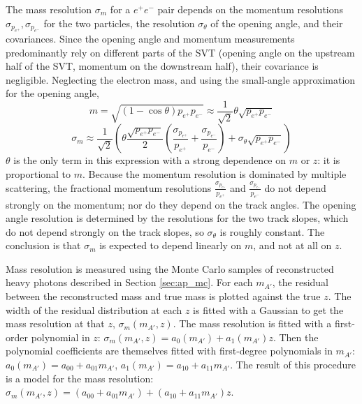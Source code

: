 The mass resolution $\sigma_m$ for a $e^+e^-$ pair depends on the momentum resolutions $\sigma_{p_{e^+}},\sigma_{p_{e^-}}$ for the two particles, the resolution $\sigma_\theta$ of the opening angle, and their covariances.
Since the opening angle and momentum measurements predominantly rely on different parts of the SVT (opening angle on the upstream half of the SVT, momentum on the downstream half), their covariance is negligible.
Neglecting the electron mass, and using the small-angle approximation for the opening angle,
\begin{equation}
m=\sqrt{(1-\cos\theta)p_{e^+}p_{e^-}} \approx \frac{1}{\sqrt{2}}\theta\sqrt{p_{e^+}p_{e^-}}
\end{equation}
\begin{equation}
\sigma_m\approx \frac{1}{\sqrt{2}}\left(\theta \frac{\sqrt{p_{e^+}p_{e^-}}}{2}\left(\frac{\sigma_{p_{e^+}}}{p_{e^+}}+\frac{\sigma_{p_{e^-}}}{p_{e^-}}\right)  + \sigma_\theta\sqrt{p_{e^+}p_{e^-}} \right)
\end{equation}
$\theta$ is the only term in this expression with a strong dependence on $m$ or $z$: it is proportional to $m$.
Because the momentum resolution is dominated by multiple scattering, the fractional momentum resolutions $\frac{\sigma_{p_{e^+}}}{p_{e^+}}$ and $\frac{\sigma_{p_{e^-}}}{p_{e^-}}$ do not depend strongly on the momentum; nor do they depend on the track angles.
The opening angle resolution is determined by the resolutions for the two track slopes, which do not depend strongly on the track slopes, so $\sigma_\theta$ is roughly constant.
The conclusion is that $\sigma_m$ is expected to depend linearly on $m$, and not at all on $z$.

Mass resolution is measured using the Monte Carlo samples of reconstructed heavy photons described in Section \ref{sec:ap_mc}.
For each $m_{A'}$, the residual between the reconstructed mass and true mass is plotted against the true $z$.
The width of the residual distribution at each $z$ is fitted with a Gaussian to get the mass resolution at that $z$, $\sigma_m(m_{A'},z)$.
The mass resolution is fitted with a first-order polynomial in $z$:
$\sigma_m(m_{A'},z) = a_0(m_{A'}) + a_1(m_{A'}) z$.
Then the polynomial coefficients are themselves fitted with first-degree polynomials in $m_{A'}$: $a_0(m_{A'}) = a_{00} + a_{01}m_{A'}$, $a_1(m_{A'}) = a_{10} + a_{11}m_{A'}$.
The result of this procedure is a model for the mass resolution: $\sigma_m(m_{A'},z) = (a_{00} + a_{01}m_{A'}) + (a_{10} + a_{11}m_{A'}) z$.

